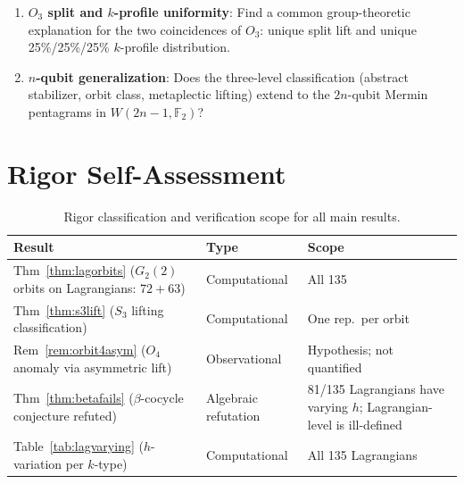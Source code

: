\documentclass[11pt,a4paper]{article}
\theoremstyle{remark}
\begin{document}
\begin{enumerate}
  \item \textbf{$O_3$ split and $k$-profile uniformity}:
        Find a common group-theoretic explanation for the two coincidences
        of $O_3$: unique split lift and unique 25\%/25\%/25\% $k$-profile
        distribution.

  \item \textbf{$n$-qubit generalization}:
        Does the three-level classification (abstract stabilizer, orbit class,
        metaplectic lifting) extend to the $2n$-qubit Mermin pentagrams
        in $W(2n-1, \mathbb{F}_2)$?
\end{enumerate}


\appendix
\setcounter{table}{4}
\renewcommand{\thetable}{A\arabic{table}}
\renewcommand{\theHtable}{A\arabic{table}}
\section{Rigor Self-Assessment}

\begin{table}[H]
\centering
\caption{Rigor classification and verification scope for all main results.}
\label{tab:rigor}
\begin{tabular}{p{6.2cm}lp{4.5cm}}
\toprule
Result & Type & Scope \\
\midrule
Thm~\ref{thm:lagorbits} ($G_2(2)$ orbits on Lagrangians: $72+63$)
  & Computational & All 135 \cite{PaperXVsuppl} \\
Thm~\ref{thm:s3lift} ($S_3$ lifting classification)
  & Computational & One rep.\ per orbit \cite{PaperXVsuppl} \\
Rem~\ref{rem:orbit4asym} ($O_4$ anomaly via asymmetric lift)
  & Observational & Hypothesis; not quantified \\
Thm~\ref{thm:betafails} ($\beta$-cocycle conjecture refuted)
  & Algebraic refutation & 81/135 Lagrangians have varying $h$; Lagrangian-level is ill-defined \cite{PaperXVsuppl} \\
Table~\ref{tab:lagvarying} ($h$-variation per $k$-type)
  & Computational & All 135 Lagrangians \cite{PaperXVsuppl} \\
\bottomrule
\end{tabular}
\end{table}
\end{document}

